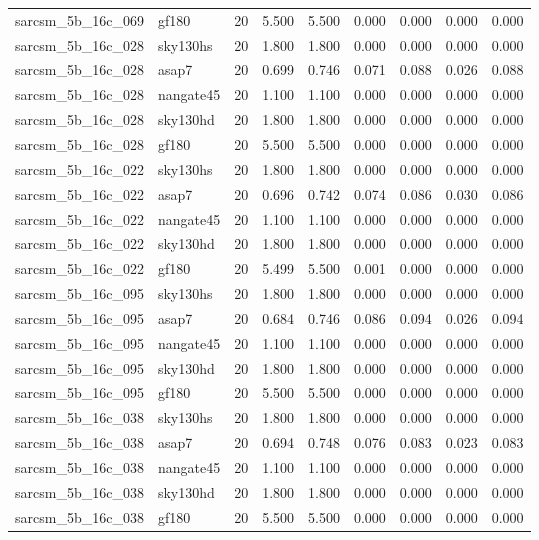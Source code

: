 \begin{tabular}{llrrrrrrr}
sarcsm\_5b\_16c\_069 & gf180 & 20 & 5.500 & 5.500 & 0.000 & 0.000 & 0.000 & 0.000 \\
sarcsm\_5b\_16c\_028 & sky130hs & 20 & 1.800 & 1.800 & 0.000 & 0.000 & 0.000 & 0.000 \\
sarcsm\_5b\_16c\_028 & asap7 & 20 & 0.699 & 0.746 & 0.071 & 0.088 & 0.026 & 0.088 \\
sarcsm\_5b\_16c\_028 & nangate45 & 20 & 1.100 & 1.100 & 0.000 & 0.000 & 0.000 & 0.000 \\
sarcsm\_5b\_16c\_028 & sky130hd & 20 & 1.800 & 1.800 & 0.000 & 0.000 & 0.000 & 0.000 \\
sarcsm\_5b\_16c\_028 & gf180 & 20 & 5.500 & 5.500 & 0.000 & 0.000 & 0.000 & 0.000 \\
sarcsm\_5b\_16c\_022 & sky130hs & 20 & 1.800 & 1.800 & 0.000 & 0.000 & 0.000 & 0.000 \\
sarcsm\_5b\_16c\_022 & asap7 & 20 & 0.696 & 0.742 & 0.074 & 0.086 & 0.030 & 0.086 \\
sarcsm\_5b\_16c\_022 & nangate45 & 20 & 1.100 & 1.100 & 0.000 & 0.000 & 0.000 & 0.000 \\
sarcsm\_5b\_16c\_022 & sky130hd & 20 & 1.800 & 1.800 & 0.000 & 0.000 & 0.000 & 0.000 \\
sarcsm\_5b\_16c\_022 & gf180 & 20 & 5.499 & 5.500 & 0.001 & 0.000 & 0.000 & 0.000 \\
sarcsm\_5b\_16c\_095 & sky130hs & 20 & 1.800 & 1.800 & 0.000 & 0.000 & 0.000 & 0.000 \\
sarcsm\_5b\_16c\_095 & asap7 & 20 & 0.684 & 0.746 & 0.086 & 0.094 & 0.026 & 0.094 \\
sarcsm\_5b\_16c\_095 & nangate45 & 20 & 1.100 & 1.100 & 0.000 & 0.000 & 0.000 & 0.000 \\
sarcsm\_5b\_16c\_095 & sky130hd & 20 & 1.800 & 1.800 & 0.000 & 0.000 & 0.000 & 0.000 \\
sarcsm\_5b\_16c\_095 & gf180 & 20 & 5.500 & 5.500 & 0.000 & 0.000 & 0.000 & 0.000 \\
sarcsm\_5b\_16c\_038 & sky130hs & 20 & 1.800 & 1.800 & 0.000 & 0.000 & 0.000 & 0.000 \\
sarcsm\_5b\_16c\_038 & asap7 & 20 & 0.694 & 0.748 & 0.076 & 0.083 & 0.023 & 0.083 \\
sarcsm\_5b\_16c\_038 & nangate45 & 20 & 1.100 & 1.100 & 0.000 & 0.000 & 0.000 & 0.000 \\
sarcsm\_5b\_16c\_038 & sky130hd & 20 & 1.800 & 1.800 & 0.000 & 0.000 & 0.000 & 0.000 \\
sarcsm\_5b\_16c\_038 & gf180 & 20 & 5.500 & 5.500 & 0.000 & 0.000 & 0.000 & 0.000 \\

\end{tabular}

